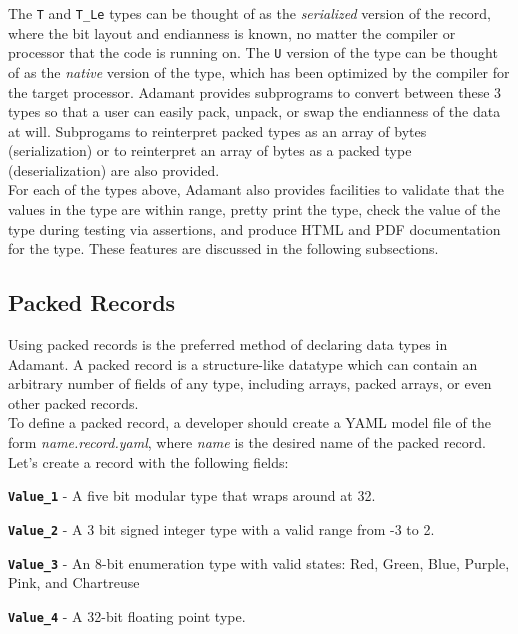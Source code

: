 The \texttt{T} and \texttt{T\_Le} types can be thought of as the \textit{serialized} version of the record, where the bit layout and endianness is known, no matter the compiler or processor that the code is running on. The \texttt{U} version of the type can be thought of as the \textit{native} version of the type, which has been optimized by the compiler for the target processor. Adamant provides subprograms to convert between these 3 types so that a user can easily pack, unpack, or swap the endianness of the data at will. Subprogams to reinterpret packed types as an array of bytes (serialization) or to reinterpret an array of bytes as a packed type (deserialization) are also provided. \\

For each of the types above, Adamant also provides facilities to validate that the values in the type are within range, pretty print the type, check the value of the type during testing via assertions, and produce HTML and PDF documentation for the type. These features are discussed in the following subsections.

\subsection{Packed Records} \label{Packed Records}

Using packed records is the preferred method of declaring data types in Adamant. A packed record is a structure-like datatype which can contain an arbitrary number of fields of any type, including arrays, packed arrays, or even other packed records. \\

To define a packed record, a developer should create a YAML model file of the form \textit{name.record.yaml}, where \textit{name} is the desired name of the packed record. Let's create a record with the following fields:

\vspace{5mm} %
\begin{spaceditemize}
  \item \textbf{\texttt{Value\_1}} - A five bit modular type that wraps around at 32.
  \item \textbf{\texttt{Value\_2}} - A 3 bit signed integer type with a valid range from -3 to 2.
  \item \textbf{\texttt{Value\_3}} - An 8-bit enumeration type with valid states: Red, Green, Blue, Purple, Pink, and Chartreuse
  \item \textbf{\texttt{Value\_4}} - A 32-bit floating point type.
\end{spaceditemize}
\vspace{5mm} %

